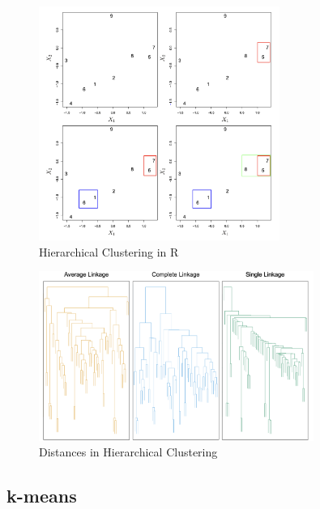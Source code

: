 \begin{figure}[H]
    \centering
    \includegraphics[width=0.7\textwidth]{assets/fig36.png}
    \caption{Hierarchical Clustering in R}
\end{figure}

\begin{figure}[H]
    \centering
    \includegraphics[width=0.8\textwidth]{assets/fig37.png}
    \caption{Distances in Hierarchical Clustering}
\end{figure}

\vspace{-1.5em}

\subsection{k-means}


